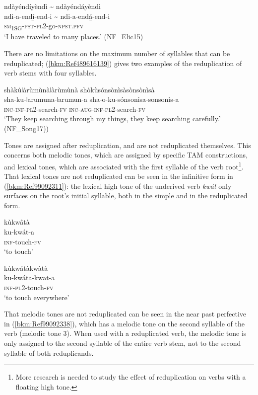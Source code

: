 \ea
\label{bkm:Ref489617670}
ndàyéndíyèndì {\textasciitilde} ndàyéndáyèndì\\
\gll ndi-a-endí̲-end-i {\textasciitilde} ndi-a-endá̲-end-i\\
\textsc{sm}\textsubscript{1SG}-\textsc{pst}-\textsc{pl}2-go-\textsc{npst}.\textsc{pfv}\\
\glt ‘I have traveled to many places.’ (NF\_Elic15)
\z

There are no limitations on the maximum number of syllables that can be reduplicated; (\ref{bkm:Ref489616139}) gives two examples of the reduplication of verb stems with four syllables.

\ea
\label{bkm:Ref489616139}
shàkùǀàrùmùnàǀàrùmùnà shòkùsónsònìsàsònsònìsà\\
\gll sha-ku-ǀarumuna-ǀarumun-a  sha-o-ku-sónsonisa-sonsonis-a\\
\textsc{inc}-\textsc{inf}-\textsc{pl}2-search-\textsc{fv}  \textsc{inc}-\textsc{aug}-\textsc{inf}-\textsc{pl}2-search-\textsc{fv}\\
\glt ‘They keep searching through my things, they keep searching carefully.’ (NF\_Song17))
\z

Tones are assigned after reduplication, and are not reduplicated themselves. This concerns both melodic tones, which are assigned by specific TAM constructions, and lexical tones, which are associated with the first syllable of the verb root\footnote{More research is needed to study the effect of reduplication on verbs with a floating high tone.}. That lexical tones are not reduplicated can be seen in the infinitive form in (\ref{bkm:Ref99092311}): the lexical high tone of the underived verb \textit{kwát} only surfaces on the root’s initial syllable, both in the simple and in the reduplicated form.

\ea
\label{bkm:Ref99092311}
\glll kùkwâtà\\
ku-kwát-a\\
\textsc{inf}-touch-\textsc{fv}\\
\glt ‘to touch’
\z

\ea
\glll kùkwátàkwàtà\\
ku-kwáta-kwat-a\\
\textsc{inf}-\textsc{pl}2-touch-\textsc{fv}\\
\glt ‘to touch everywhere’
\z

That melodic tones are not reduplicated can be seen in the near past perfective in (\ref{bkm:Ref99092338}), which has a melodic tone on the second syllable of the verb (melodic tone 3). When used with a reduplicated verb, the melodic tone is only assigned to the second syllable of the entire verb stem, not to the second syllable of both reduplicands.

